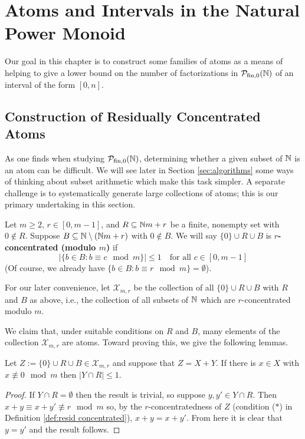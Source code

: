 \chapter{Atoms and Intervals in the Natural Power Monoid}

Our goal in this chapter is to construct some families of atoms as a means of helping to give a lower bound on the number of factorizations in ${\mathcal{P}_{\textrm{fin},0}(\mathbb{N})}$ of an interval of the form $[0,n]$.


\section{Construction of Residually Concentrated Atoms}

As one finds when studying ${\mathcal{P}_{\textrm{fin},0}(\mathbb{N})}$, determining whether a given subset of $\mathbb{N}$ is an atom can be difficult.
We will see later in Section \ref{sec:algorithms} some ways of thinking about subset arithmetic which make this task simpler.
A separate challenge is to systematically generate large collections of atoms; this is our primary undertaking in this section.

\begin{defn} \label{def:resid concentrated}
Let $m\ge 2$, $r\in [0,m-1]$, and $R\subseteq \mathbb{N} m +r $ be a finite, nonempty set with $0\notin R$.
Suppose $B\subseteq \mathbb{N} \setminus (\mathbb{N} m + r)$ with $0\notin B$.
We will say $\{0\}\cup R \cup B$ is \textbf{$r$-concentrated (modulo $m$)} if
\[|\{b\in B: b\equiv c \mod m\}| \le 1 \quad \textrm{for all } c\in [0,m-1] \tag{$*$} \]
(Of course, we already have $\{b\in B: b\equiv r \mod m\}=\emptyset$).

For our later convenience, let $\mathcal{X}_{m,r}$ be the collection of all $\{0\}\cup R \cup B$ with $R$ and $B$ as above, i.e., the collection of all subsets of $\mathbb{N}$ which are $r$-concentrated modulo $m$.
\end{defn}

We claim that, under suitable conditions on $R$ and $B$, many elements of the collection $\mathcal{X}_{m,r}$ are atoms.  
Toward proving this, we give the following lemmas.

\begin{lemma} \label{lem:other summand small}
Let $Z := \{0\}\cup R \cup B\in \mathcal{X}_{m,r}$ and suppose that $Z = X+Y$.
If there is $x\in X$ with $x\not\equiv 0 \mod m$ then $|Y\cap R| \le 1$.
\end{lemma}

\begin{proof}
If $Y\cap R=\emptyset$ then the result is trivial, so suppose $y,y'\in Y\cap R$.
Then $x+y \equiv x+y' \not\equiv r \mod m$ so, by the $r$-concentratedness of $Z$ (condition ($*$) in Definition \ref{def:resid concentrated}), $x+y = x+y'$.
From here it is clear that $y=y'$ and the result follows.
\end{proof}

